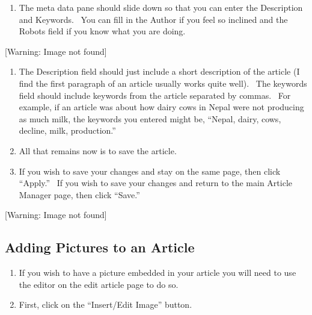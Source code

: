 \documentclass[12pt,twoside]{article}
\newcounter{saveenum}
\newcommand\liststyleLi{%
\renewcommand\theenumi{\arabic{enumi}}
\renewcommand\theenumii{\arabic{enumii}}
\renewcommand\theenumiii{\arabic{enumiii}}
\renewcommand\theenumiv{\arabic{enumiv}}
\renewcommand\labelenumi{1.\theenumi)}
\renewcommand\labelenumii{\theenumii.}
\renewcommand\labelenumiii{\theenumiii.}
\renewcommand\labelenumiv{\theenumiv.}
}
\newcommand\liststyleLii{%
\renewcommand\theenumi{\arabic{enumi}}
\renewcommand\theenumii{\arabic{enumii}}
\renewcommand\theenumiii{\arabic{enumiii}}
\renewcommand\theenumiv{\arabic{enumiv}}
\renewcommand\labelenumi{2.\theenumi)}
\renewcommand\labelenumii{\theenumii.}
\renewcommand\labelenumiii{\theenumiii.}
\renewcommand\labelenumiv{\theenumiv.}
}
\begin{document}
\liststyleLi
\setcounter{saveenum}{\value{enumi}}
\begin{enumerate}
\setcounter{enumi}{\value{saveenum}}
\item {
The meta data pane should slide down so that you can enter the
Description and Keywords. \ You can fill in the Author if you feel so
inclined and the Robots field if you know what you are doing.}
\end{enumerate}
{\centering{}
 [Warning: Image not found] 
\par}

\liststyleLi
\setcounter{saveenum}{\value{enumi}}
\begin{enumerate}
\setcounter{enumi}{\value{saveenum}}
\item {
The Description field should just include a short description of the
article (I find the first paragraph of an article usually works quite
well). \ The keywords field should include keywords from the article
separated by commas. \ For example, if an article was about how dairy
cows in Nepal were not producing as much milk, the keywords you entered
might be, ``Nepal, dairy, cows, decline, milk, production.''}
\item {
All that remains now is to save the article.}
\item {
If you wish to save your changes and stay on the same page, then click
``Apply.'' \ If you wish to save your changes and return to the main
Article Manager page, then click ``Save.''}
\end{enumerate}
{\centering{}
 [Warning: Image not found] 
\par}


\bigskip

\subsection{Adding Pictures to an Article}

\bigskip

\liststyleLii
\begin{enumerate}
\item {\mdseries
If you wish to have a picture embedded in your article you will need to
use the editor on the edit article page to do so.}
\item {\mdseries
First, click on the ``Insert/Edit Image'' button.}
\end{enumerate}
{\centering{} 
\par}
\end{document}
